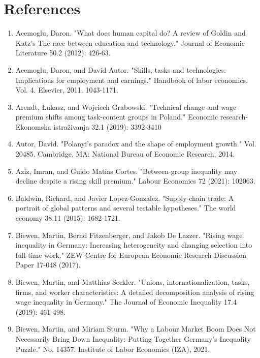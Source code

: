 \documentclass{article}
\begin{document}
\section{References}
\begin{enumerate}
\item Acemoglu, Daron. "What does human capital do? A review of Goldin and Katz's The race between education and technology." Journal of Economic Literature 50.2 (2012): 426-63.

\item Acemoglu, Daron, and David Autor. "Skills, tasks and technologies: Implications for employment and earnings." Handbook of labor economics. Vol. 4. Elsevier, 2011. 1043-1171.

\item Arendt, Łukasz, and Wojciech Grabowski. "Technical change and wage premium shifts among task-content groups in Poland." Economic research-Ekonomska istraživanja 32.1 (2019): 3392-3410

\item Autor, David. "Polanyi's paradox and the shape of employment growth." Vol. 20485. Cambridge, MA: National Bureau of Economic Research, 2014.

\item Aziz, Imran, and Guido Matias Cortes. "Between-group inequality may decline despite a rising skill premium." Labour Economics 72 (2021): 102063.

\item Baldwin, Richard, and Javier Lopez‐Gonzalez. "Supply‐chain trade: A portrait of global patterns and several testable hypotheses." The world economy 38.11 (2015): 1682-1721.

\item Biewen, Martin, Bernd Fitzenberger, and Jakob De Lazzer. "Rising wage inequality in Germany: Increasing heterogeneity and changing selection into full-time work." ZEW-Centre for European Economic Research Discussion Paper 17-048 (2017).

\item Biewen, Martin, and Matthias Seckler. "Unions, internationalization, tasks, firms, and worker characteristics: A detailed decomposition analysis of rising wage inequality in Germany." The Journal of Economic Inequality 17.4 (2019): 461-498.

\item Biewen, Martin, and Miriam Sturm. "Why a Labour Market Boom Does Not Necessarily Bring Down Inequality: Putting Together Germany's Inequality Puzzle." No. 14357. Institute of Labor Economics (IZA), 2021.


\end{enumerate}
\end{document}
